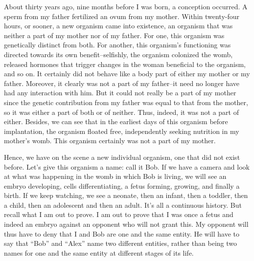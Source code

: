About thirty years ago, nine months before I was born, a conception 
occurred.  A sperm from my father fertilized an ovum from my mother.  
Within  twenty-four  hours,  or  sooner,  a  new  organism  came    into 
existence, an organism that was neither a part of my mother nor of my 
father.  For one, this organism was genetically distinct from both.  For 
another,  this  organism’s  functioning  was  directed  towards  its  own 
benefit–selfishly, the organism colonized the womb, released hormones 
that trigger changes in the woman beneficial to the organism, and so on.  
It certainly did not behave like a body part of either my mother or my 
father.  Moreover, it clearly was not a part of my father–it need no longer 
have had any interaction with him.  But it could not really be a part of my 
mother since the genetic contribution from my father was equal to that 
from  the  mother,  so  it  was  either  a  part  of  both  or  of  neither.    Thus, 
indeed, it was not a part of either.  Besides, we can see that in the earliest 
days  of  this  organism  before  implantation,  the  organism  floated  free, 
independently seeking nutrition in my mother’s womb.  This organism 
certainly was not a part of my mother. 

Hence, we have on the scene a new individual organism, one that 
did not exist before.  Let’s give this organism a name: call it Bob.  If we 
have a camera and look at what was happening in the womb in which 
Bob is living, we will see an embryo developing, cells differentiating, a 
fetus forming, growing, and finally a birth.  If we keep watching, we see 
a neonate, then an infant, then a toddler, then a child, then an adolescent 
and then an adult.  It’s all a continuous history.  But recall what I am out 
to prove.  I am out to prove that I was once a fetus and indeed an embryo 
against an opponent who will not grant this.  My opponent will thus have 
to deny that I and Bob are one and the same entity.  He will have to say 
that “Bob” and “Alex” name two different entities, rather than being two 
names for one and the same entity at different stages of its life. 

